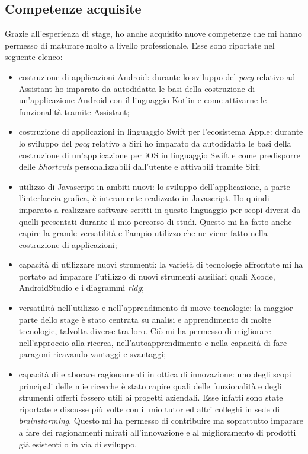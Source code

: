 \subsection{Competenze acquisite}
Grazie all'esperienza di stage, ho anche acquisito nuove competenze che mi hanno permesso di maturare molto a livello professionale. Esse sono riportate nel seguente elenco:
\begin{itemize}
	\item costruzione di applicazioni Android: durante lo sviluppo del \emph{\gls{pocg}} relativo ad Assistant ho imparato da autodidatta le basi della costruzione di un'applicazione Android con il linguaggio Kotlin e come attivarne le funzionalità tramite Assistant;
	\item costruzione di applicazioni in linguaggio Swift per l'ecosistema Apple: durante lo sviluppo del \emph{\gls{pocg}} relativo a Siri ho imparato da autodidatta le basi della costruzione di un'applicazione per iOS in linguaggio Swift e come predisporre delle \emph{Shortcuts} personalizzabili dall'utente e attivabili tramite Siri;
	\item utilizzo di Javascript in ambiti nuovi: lo sviluppo dell'applicazione, a parte l'interfaccia grafica, è interamente realizzato in Javascript. Ho quindi imparato a realizzare software scritti in questo linguaggio per scopi diversi da quelli presentati durante il mio percorso di studi. Questo mi ha fatto anche capire la grande versatilità e l'ampio utilizzo che ne viene fatto nella costruzione di applicazioni;
	\item capacità di utilizzare nuovi strumenti: la varietà di tecnologie affrontate mi ha portato ad imparare l'utilizzo di nuovi strumenti ausiliari quali Xcode, AndroidStudio e i diagrammi \emph{\gls{rldg}};
	\item versatilità nell'utilizzo e nell'apprendimento di nuove tecnologie: la maggior parte dello stage è stato centrata su analisi e apprendimento di molte tecnologie, talvolta diverse tra loro. Ciò mi ha permesso di migliorare nell'approccio alla ricerca, nell'autoapprendimento e nella capacità di fare paragoni ricavando vantaggi e svantaggi;
	\item capacità di elaborare ragionamenti in ottica di innovazione: uno degli scopi principali delle mie ricerche è stato capire quali delle funzionalità e degli strumenti offerti fossero utili ai progetti aziendali. Esse infatti sono state riportate e discusse più volte con il mio tutor ed altri colleghi in sede di \emph{\gls{brainstorming}}\glsfirstoccur. Questo mi ha permesso di contribuire ma soprattutto imparare a fare dei ragionamenti mirati all'innovazione e al miglioramento di prodotti già esistenti o in via di sviluppo.
\end{itemize}
